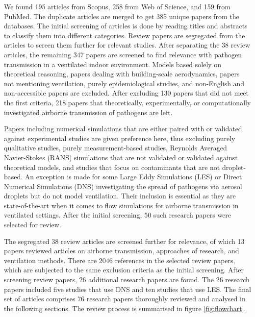 \documentclass[a4paper,12pt]{elsarticle}
\begin{document}
We found 195 articles from Scopus, 258 from Web of Science, and 159 from PubMed. The duplicate articles are merged to get 385 unique papers from the databases. The initial screening of articles is done by reading titles and abstracts to classify them into different categories. Review papers are segregated from the articles to screen them further for relevant studies. After separating the 38 review articles, the remaining 347 papers are screened to find relevance with pathogen transmission in a ventilated indoor environment. Models based solely on theoretical reasoning, papers dealing with building-scale aerodynamics, papers not mentioning ventilation, purely epidemiological studies, and non-English and non-accessible papers are excluded. After excluding 130 papers that did not meet the first criteria, 218 papers that theoretically, experimentally, or computationally investigated airborne transmission of pathogens are left.

Papers including numerical simulations that are either paired with or validated against experimental studies are given preference here, thus excluding purely qualitative studies, purely measurement-based studies, Reynolds Averaged Navier-Stokes (RANS) simulations that are not validated or validated against theoretical models, and studies that focus on contaminants that are not droplet-based. An exception is made for some Large Eddy Simulations (LES) or Direct Numerical Simulations (DNS) investigating the spread of pathogens via aerosol droplets but do not model ventilation. Their inclusion is essential as they are state-of-the-art when it comes to flow simulations for airborne transmission in ventilated settings. After the initial screening, 50 such research papers were selected for review. 

The segregated 38 review articles are screened further for relevance, of which 13 papers reviewed articles on airborne transmission, approaches of research, and ventilation methods. There are 2046 references in the selected review papers, which are subjected to the same exclusion criteria as the initial screening. After screening review papers, 26 additional research papers are found. The 26 research papers included five studies that use DNS and ten studies that use LES. The final set of articles comprises 76 research papers thoroughly reviewed and analysed in the following sections. The review process is summarised in figure \ref{fig:flowchart}.
\end{document}
